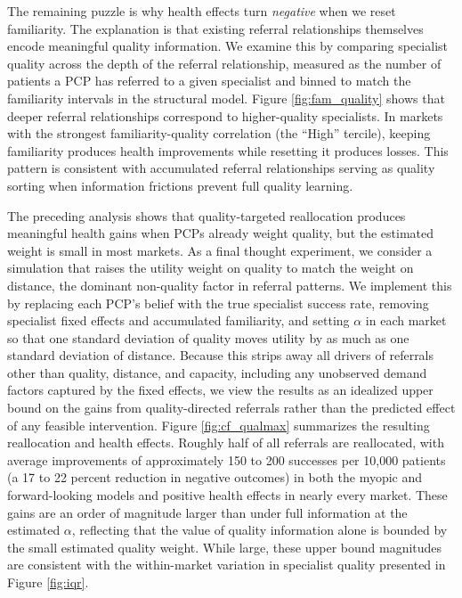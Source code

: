 \documentclass[12pt]{article}
\begin{document}
The remaining puzzle is why health effects turn \emph{negative} when we reset familiarity. The explanation is that existing referral relationships themselves encode meaningful quality information. We examine this by comparing specialist quality across the depth of the referral relationship, measured as the number of patients a PCP has referred to a given specialist and binned to match the familiarity intervals in the structural model. Figure \ref{fig:fam_quality} shows that deeper referral relationships correspond to higher-quality specialists. In markets with the strongest familiarity-quality correlation (the ``High'' tercile), keeping familiarity produces health improvements while resetting it produces losses. This pattern is consistent with accumulated referral relationships serving as quality sorting when information frictions prevent full quality learning.

The preceding analysis shows that quality-targeted reallocation produces meaningful health gains when PCPs already weight quality, but the estimated weight is small in most markets. As a final thought experiment, we consider a simulation that raises the utility weight on quality to match the weight on distance, the dominant non-quality factor in referral patterns. We implement this by replacing each PCP's belief with the true specialist success rate, removing specialist fixed effects and accumulated familiarity, and setting $\alpha$ in each market so that one standard deviation of quality moves utility by as much as one standard deviation of distance. Because this strips away all drivers of referrals other than quality, distance, and capacity, including any unobserved demand factors captured by the fixed effects, we view the results as an idealized upper bound on the gains from quality-directed referrals rather than the predicted effect of any feasible intervention. Figure \ref{fig:cf_qualmax} summarizes the resulting reallocation and health effects. Roughly half of all referrals are reallocated, with average improvements of approximately 150 to 200 successes per 10,000 patients (a 17 to 22 percent reduction in negative outcomes) in both the myopic and forward-looking models and positive health effects in nearly every market. These gains are an order of magnitude larger than under full information at the estimated $\alpha$, reflecting that the value of quality information alone is bounded by the small estimated quality weight. While large, these upper bound magnitudes are consistent with the within-market variation in specialist quality presented in Figure \ref{fig:iqr}.
\end{document}
